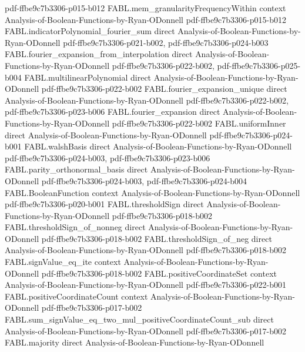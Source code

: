 \begin{theorem}
  {pdf-ffbe9c7b3306-p015-b012}
\proofstep
  {FABL.mem_granularityFrequencyWithin}
  {context}
  {Analysis-of-Boolean-Functions-by-Ryan-ODonnell}
  {pdf-ffbe9c7b3306-p015-b012}
\proofstep
  {FABL.indicatorPolynomial_fourier_sum}
  {direct}
  {Analysis-of-Boolean-Functions-by-Ryan-ODonnell}
  {pdf-ffbe9c7b3306-p021-b002,
    pdf-ffbe9c7b3306-p024-b003}
\proofstep
  {FABL.fourier_expansion_from_interpolation}
  {direct}
  {Analysis-of-Boolean-Functions-by-Ryan-ODonnell}
  {pdf-ffbe9c7b3306-p022-b002,
    pdf-ffbe9c7b3306-p025-b004}
\proofstep
  {FABL.multilinearPolynomial}
  {direct}
  {Analysis-of-Boolean-Functions-by-Ryan-ODonnell}
  {pdf-ffbe9c7b3306-p022-b002}
\proofstep
  {FABL.fourier_expansion_unique}
  {direct}
  {Analysis-of-Boolean-Functions-by-Ryan-ODonnell}
  {pdf-ffbe9c7b3306-p022-b002,
    pdf-ffbe9c7b3306-p023-b006}
\proofstep
  {FABL.fourier_expansion}
  {direct}
  {Analysis-of-Boolean-Functions-by-Ryan-ODonnell}
  {pdf-ffbe9c7b3306-p022-b002}
\proofstep
  {FABL.uniformInner}
  {direct}
  {Analysis-of-Boolean-Functions-by-Ryan-ODonnell}
  {pdf-ffbe9c7b3306-p024-b001}
\proofstep
  {FABL.walshBasis}
  {direct}
  {Analysis-of-Boolean-Functions-by-Ryan-ODonnell}
  {pdf-ffbe9c7b3306-p024-b003,
    pdf-ffbe9c7b3306-p023-b006}
\proofstep
  {FABL.parity_orthonormal_basis}
  {direct}
  {Analysis-of-Boolean-Functions-by-Ryan-ODonnell}
  {pdf-ffbe9c7b3306-p024-b003,
    pdf-ffbe9c7b3306-p024-b004}
\proofstep
  {FABL.BooleanFunction}
  {context}
  {Analysis-of-Boolean-Functions-by-Ryan-ODonnell}
  {pdf-ffbe9c7b3306-p020-b001}
\proofstep
  {FABL.thresholdSign}
  {direct}
  {Analysis-of-Boolean-Functions-by-Ryan-ODonnell}
  {pdf-ffbe9c7b3306-p018-b002}
\proofstep
  {FABL.thresholdSign_of_nonneg}
  {direct}
  {Analysis-of-Boolean-Functions-by-Ryan-ODonnell}
  {pdf-ffbe9c7b3306-p018-b002}
\proofstep
  {FABL.thresholdSign_of_neg}
  {direct}
  {Analysis-of-Boolean-Functions-by-Ryan-ODonnell}
  {pdf-ffbe9c7b3306-p018-b002}
\proofstep
  {FABL.signValue_eq_ite}
  {context}
  {Analysis-of-Boolean-Functions-by-Ryan-ODonnell}
  {pdf-ffbe9c7b3306-p018-b002}
\proofstep
  {FABL.positiveCoordinateSet}
  {context}
  {Analysis-of-Boolean-Functions-by-Ryan-ODonnell}
  {pdf-ffbe9c7b3306-p022-b001}
\proofstep
  {FABL.positiveCoordinateCount}
  {context}
  {Analysis-of-Boolean-Functions-by-Ryan-ODonnell}
  {pdf-ffbe9c7b3306-p017-b002}
\proofstep
  {FABL.sum_signValue_eq_two_mul_positiveCoordinateCount_sub}
  {direct}
  {Analysis-of-Boolean-Functions-by-Ryan-ODonnell}
  {pdf-ffbe9c7b3306-p017-b002}
\proofstep
  {FABL.majority}
  {direct}
  {Analysis-of-Boolean-Functions-by-Ryan-ODonnell}

\end{theorem}
